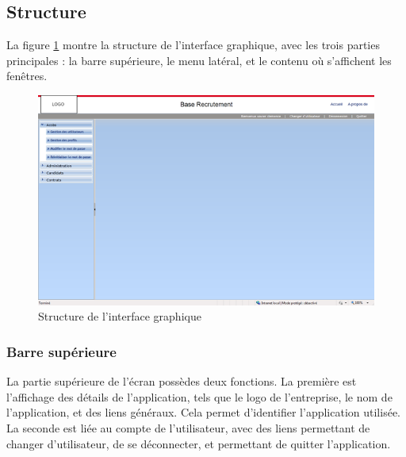 
\subsection{Structure}

La figure \ref{structure} montre la structure de l'interface graphique, avec les trois parties principales : la barre supérieure, le menu latéral, et le contenu où s'affichent les fenêtres.
\begin{figure}[!h]
	\center
	\includegraphics[width=1\textwidth]{img/structure.png}
	\caption{Structure de l'interface graphique}
	\label{structure}
\end{figure}


\subsubsection{Barre supérieure}

La partie supérieure de l'écran possèdes deux fonctions.
La première est l'affichage des détails de l'application, tels que le logo de l'entreprise, le nom de l'application, et des liens généraux.
Cela permet d'identifier l'application utilisée.
La seconde est liée au compte de l'utilisateur, avec des liens permettant de changer d'utilisateur, de se déconnecter, et permettant de quitter l'application.


